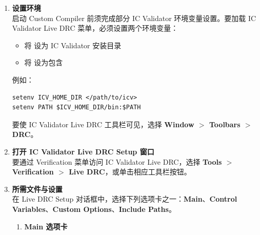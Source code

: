 \begin{enumerate}
  \item \textbf{设置环境}\\
  启动 Custom Compiler 前须完成部分 IC Validator 环境变量设置。要加载 IC Validator Live DRC 菜单，必须设置两个环境变量：
  \begin{itemize}
    \item 将  设为 IC Validator 安装目录
    \item 将  设为包含 
  \end{itemize}
  例如：
\begin{lstlisting}
setenv ICV_HOME_DIR </path/to/icv>
setenv PATH $ICV_HOME_DIR/bin:$PATH
\end{lstlisting}
  要使 IC Validator Live DRC 工具栏可见，选择 \textbf{Window $>$ Toolbars $>$ DRC}。

  \item \textbf{打开 IC Validator Live DRC Setup 窗口}\\
  要通过 Verification 菜单访问 IC Validator Live DRC，选择 \textbf{Tools $>$ Verification $>$ Live DRC}，或单击相应工具栏按钮。

  \item \textbf{所需文件与设置}\\
  在 Live DRC Setup 对话框中，选择下列选项卡之一：\textbf{Main}、\textbf{Control Variables}、\textbf{Custom Options}、\textbf{Include Paths}。
  \begin{enumerate}[label=\alph*.]
    \item \textbf{Main 选项卡}



\end{enumerate}
\end{enumerate}
